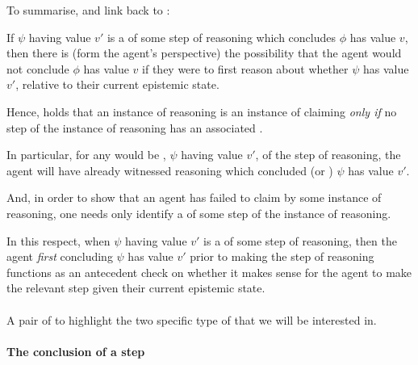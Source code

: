 \begin{note}[Summary]
  To summarise, and link back to \ideaCS{}:

  If \(\psi\) having value \(v'\) is a \requ{} of some step of reasoning which concludes \(\phi\) has value \(v\), then there is (form the agent's perspective) the possibility that the agent would not conclude \(\phi\) has value \(v\) if they were to first reason about whether \(\psi\) has value \(v'\), relative to their current epistemic state.

  Hence, \ideaCS{} holds that an instance of reasoning is an instance of claiming \support{} \emph{only if} no step of the instance of reasoning has an associated \requ{}.

  In particular, for any would be \requ{}, \(\psi\) having value \(v'\), of the step of reasoning, the agent will have already witnessed reasoning which concluded (or \indicateVed{}) \(\psi\) has value \(v'\).

  And, in order to show that an agent has failed to claim \support{} by some instance of reasoning, one needs only identify a \requ{} of some step of the instance of reasoning.

  In this respect, when \(\psi\) having value \(v'\) is a \requ{} of some step of reasoning, then the agent \emph{first} concluding \(\psi\) has value \(v'\) prior to making the step of reasoning functions as an antecedent check on whether it makes sense for the agent to make the relevant step given their current epistemic state.
\end{note}


\paragraph{}

\begin{note}
  A pair of  to highlight the two specific type of  that we will be interested in.
\end{note}

\paragraph*{The conclusion of a step}


